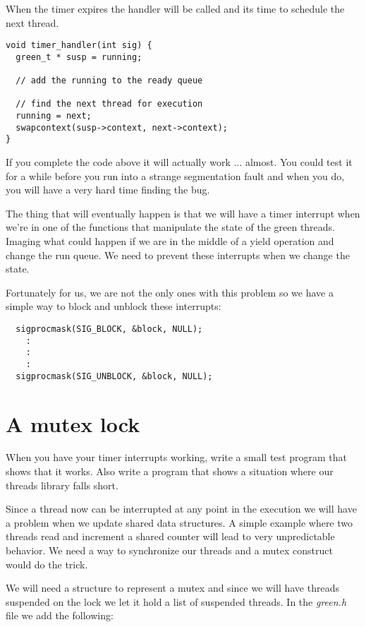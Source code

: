 \documentclass[a4paper,11pt]{article}
\begin{document}
When the timer expires the handler will be called and its time to
schedule the next thread.

\begin{lstlisting}
void timer_handler(int sig) {
  green_t * susp = running;

  // add the running to the ready queue

  // find the next thread for execution
  running = next;
  swapcontext(susp->context, next->context);
}
\end{lstlisting}

If you complete the code above it will actually work ... almost. You
could test it for a while before you run into a strange segmentation
fault and when you do, you will have a very hard time finding the bug. 

The thing that will eventually happen is that we will have a timer
interrupt when we're in one of the functions that manipulate the state
of the green threads. Imaging what could happen if we are in the
middle of a yield operation and change the run queue. We need to
prevent these interrupts when we change the state.

Fortunately for us, we are not the only ones with this problem so we
have a simple way to block and unblock these interrupts:

\begin{lstlisting}
  sigprocmask(SIG_BLOCK, &block, NULL);
    :
    :
    :
  sigprocmask(SIG_UNBLOCK, &block, NULL);  
\end{lstlisting}


\section{A mutex lock}

When you have your timer interrupts working, write a small test
program that shows that it works. Also write a program that shows a
situation where our threads library falls short.

Since a thread now can be interrupted at any point in the execution we
will have a problem when we update shared data structures. A simple
example where two threads read and increment a shared counter will
lead to very unpredictable behavior. We need a way to synchronize our
threads and a mutex construct would do the trick.

We will need a structure to represent a mutex and since we will have
threads suspended on the lock we let it hold a list of suspended
threads. In the {\em green.h} file we add the following:
\end{document}
